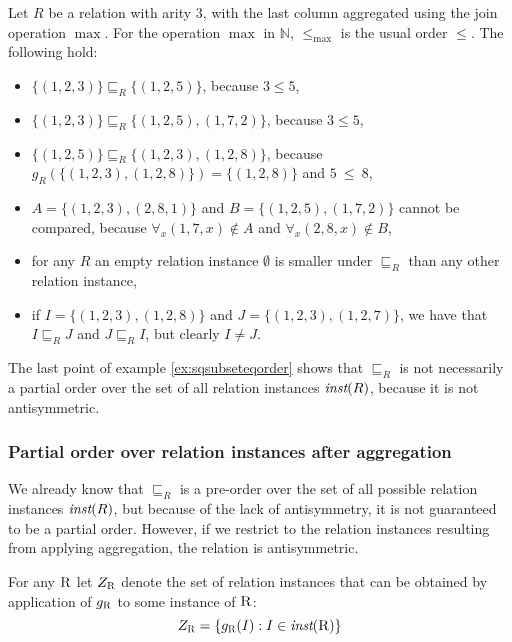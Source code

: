 \begin{exmp}
Let $R$ be a relation with arity $3$, with the last column aggregated using the join operation $\max$.
For the operation $ \max $ in $\mathbb{N}$, $ \le_{\max} $ is the usual order $ \le $. The following hold:
\begin{itemize}
\item $\{(1, 2, 3)\} \sqsubseteq_R \{(1, 2, 5)\}$, because $3 \le 5$,
\item $\{(1, 2, 3)\} \sqsubseteq_R \{(1, 2, 5), (1, 7, 2)\}$, because $3 \le 5$,
\item $\{(1, 2, 5)\} \sqsubseteq_R \{(1, 2, 3), (1, 2, 8)\}$, because $g_R(\{(1, 2, 3), (1, 2, 8)\}) = \{(1,2,8)\}$ and $5~\le~8$,
\item $A = \{(1, 2, 3), (2, 8, 1)\}$ and  $B = \{(1, 2, 5), (1, 7, 2)\}$ cannot be compared, because $\forall_x (1, 7, x) \notin A$ and $\forall_x (2, 8, x) \notin B$,
\item for any $R$ an empty relation instance $\emptyset$ is smaller under $\sqsubseteq_R$  than any other relation instance,
\item if $I = \{(1, 2, 3), (1, 2, 8)\}$ and $J = \{(1, 2, 3), (1, 2, 7)\}$, we have that $I \sqsubseteq_R J$ and $J \sqsubseteq_R I$, but clearly $I \ne J$.
\end{itemize}
\label{ex:sqsubseteqorder}
\end{exmp}

The last point of example \ref{ex:sqsubseteqorder} shows that $\sqsubseteq_R$ is not necessarily a partial order over the set of all relation instances $\textit{inst}(R)$, because it is not antisymmetric. 


\subsubsection{Partial order over relation instances after aggregation}

We already know that $\sqsubseteq_R$ is a pre-order over the set of all possible relation instances $\textit{inst}(R)$, but because of the lack of antisymmetry, it is not guaranteed to be a partial order. However, if we restrict to the relation instances resulting from applying aggregation, the relation is antisymmetric.


For any $\textsc{R}$ let $Z_\textsc{R}$ denote the set of relation instances that can be obtained by application of $g_\textsc{R}$ to some instance of $\textsc{R}$:
$$Z_\textsc{R} = \{g_\textsc{R}(I): I \in \textit{inst}(\textsc{R})\}$$

